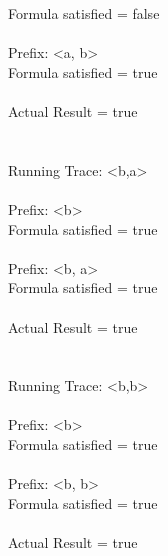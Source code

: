   Formula satisfied = false\\
\\
  Prefix: \textless a, b\textgreater\\
  Formula satisfied = true\\
\\
  Actual Result = true\\
\\
\\
Running Trace: \textless b,a\textgreater\\
\\
  Prefix: \textless b\textgreater\\
  Formula satisfied = true\\
\\
  Prefix: \textless b, a\textgreater\\
  Formula satisfied = true\\
\\
  Actual Result = true\\
\\
\\
Running Trace: \textless b,b\textgreater\\
\\
  Prefix: \textless b\textgreater\\
  Formula satisfied = true\\
\\
  Prefix: \textless b, b\textgreater\\
  Formula satisfied = true\\
\\
  Actual Result = true